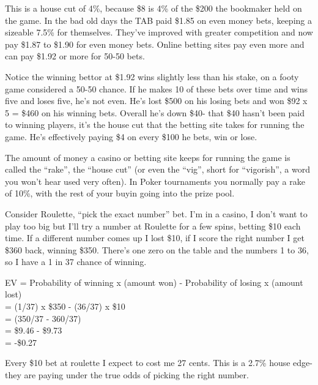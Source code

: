 This is a house cut of 4\%, because \$8 is 4\% of the \$200 the bookmaker
held on the game. In the bad old days
the TAB paid \$1.85 on even money bets, keeping a sizeable 7.5\% for
themselves. They've improved with greater competition and now pay \$1.87 to \$1.90 for
even money bets. Online betting sites pay even more and can pay
\$1.92 or more for 50-50 bets.


Notice the winning bettor at \$1.92 wins slightly less than his stake,
on a footy game considered a 50-50 chance. If he makes 10 of these
bets over time and wins five and loses five, he's not even. He's lost
\$500 on his losing bets and won \$92 x 5 = \$460 on his winning bets.
Overall he's down \$40- that \$40 hasn't been paid to winning players,
it's the house cut that the betting site takes for running the game.
He's effectively paying \$4 on every \$100 he bets, win or lose.

The amount of money a casino or betting site keeps for running the
game is called the ``rake'', the ``house cut'' (or even the ``vig'',
short for ``vigorish'', a word you won't hear used very often).
In Poker tournaments you normally pay a rake of 10\%, with the rest of
your buyin going into the prize pool.

Consider Roulette, ``pick the exact number'' bet. I'm in a casino,
I don't want to play too big but I'll try a number at Roulette for a few
spins, betting \$10 each time. If a different number comes up I lost \$10,
if I score the right number I get \$360 back, winning \$350. There's one
zero on the table and the numbers 1 to 36, so I have a 1 in 37 chance of
winning.

EV = Probability of winning x (amount won) - Probability of losing x (amount lost) \\
   = (1/37) x \$350 - (36/37) x \$10 \\
   = (350/37 - 360/37)  \\
   = \$9.46 - \$9.73 \\
   = -\$0.27

Every \$10 bet at roulette I expect to cost me 27 cents. This is a 2.7\% house
edge- they are paying under the true odds of picking the right number.


